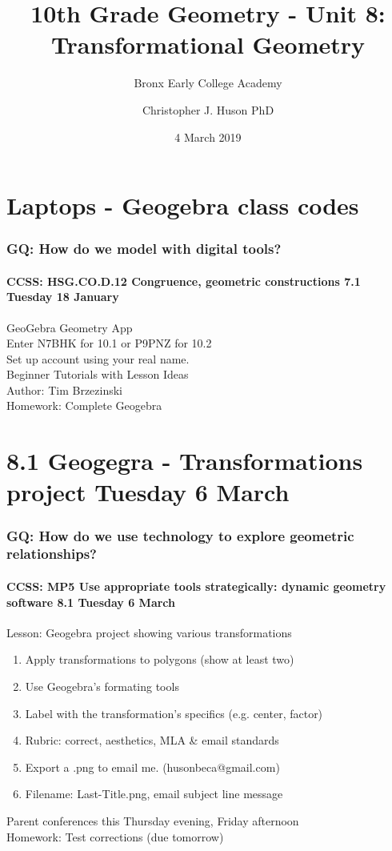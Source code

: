 \documentclass{beamer}
\title{10th Grade Geometry - Unit 8: Transformational Geometry}
\subtitle{Bronx Early College Academy}
\author{Christopher J. Huson PhD}
\date{4 March 2019}
\begin{document}
\frame{\titlepage}
\section[Outline]{}
\frame{\tableofcontents}


\section{Laptops - Geogebra class codes}
  \frame
  {
    \frametitle{GQ: How do we model with digital tools?}
    \framesubtitle{CCSS: HSG.CO.D.12 Congruence, geometric constructions  \alert{7.1 Tuesday 18 January}}

    GeoGebra Geometry App\\
    Enter \alert{N7BHK} for 10.1 or \alert{P9PNZ} for 10.2\\
    Set up account using your real name.\\
    Beginner Tutorials with Lesson Ideas\\
    Author: Tim Brzezinski\\[0.5cm]
    Homework: Complete Geogebra
  }

\section{8.1 Geogegra - Transformations project Tuesday 6 March}
  \frame
  {
    \frametitle{GQ: How do we use technology to explore geometric relationships?}
    \framesubtitle{CCSS: MP5 Use appropriate tools strategically: dynamic geometry software \hfill \alert{8.1 Tuesday 6 March}}

    \begin{block}{Lesson: Geogebra project showing various transformations}
      \begin{enumerate}
        \item Apply transformations to polygons (show at least two)
        \item Use Geogebra's formating tools
        \item Label with the transformation's specifics (e.g. center, factor)
        \item Rubric: correct, aesthetics, \alert{MLA \& email standards}
        \item Export a .png to email me. (husonbeca@gmail.com)
        \item Filename: Last-Title.png, email subject line message
      \end{enumerate}
    \end{block}
    \alert{Parent conferences this Thursday evening, Friday afternoon}\\
    Homework: Test corrections  (due tomorrow)
  }
\end{document}
